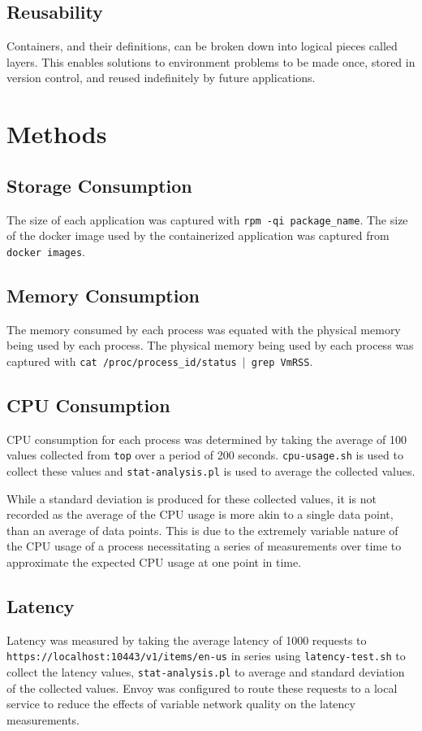 \documentclass{article}
\begin{document}
\subsection{Reusability}
Containers, and their definitions, can be broken down into logical pieces called layers. This enables solutions to environment problems to be made once, stored in version control, and reused indefinitely by future applications.

\section{Methods}
\subsection{Storage Consumption}
The size of each application was captured with \texttt{rpm -qi package\_name}. The size of the docker image used by the containerized application was captured from \texttt{docker images}.

\subsection{Memory Consumption}
The memory consumed by each process was equated with the physical memory being used by each process. The physical memory being used by each process was captured with \texttt{cat /proc/process\_id/status $|$ grep VmRSS}.

\subsection{CPU Consumption}
CPU consumption for each process was determined by taking the average of 100 values collected from \texttt{top} over a period of 200 seconds. \texttt{cpu-usage.sh} is used to collect these values and \texttt{stat-analysis.pl} is used to average the collected values.

While a standard deviation is produced for these collected values, it is not recorded as the average of the CPU usage is more akin to a single data point, than an average of data points. This is due to the extremely variable nature of the CPU usage of a process necessitating a series of measurements over time to approximate the expected CPU usage at one point in time.

\subsection{Latency}
Latency was measured by taking the average latency of 1000 requests to \\
\texttt{https://localhost:10443/v1/items/en-us} in series using \texttt{latency-test.sh} to collect the latency values, \texttt{stat-analysis.pl} to average and standard deviation of the collected values. Envoy was configured to route these requests to a local service to reduce the effects of variable network quality on the latency measurements.
\end{document}
